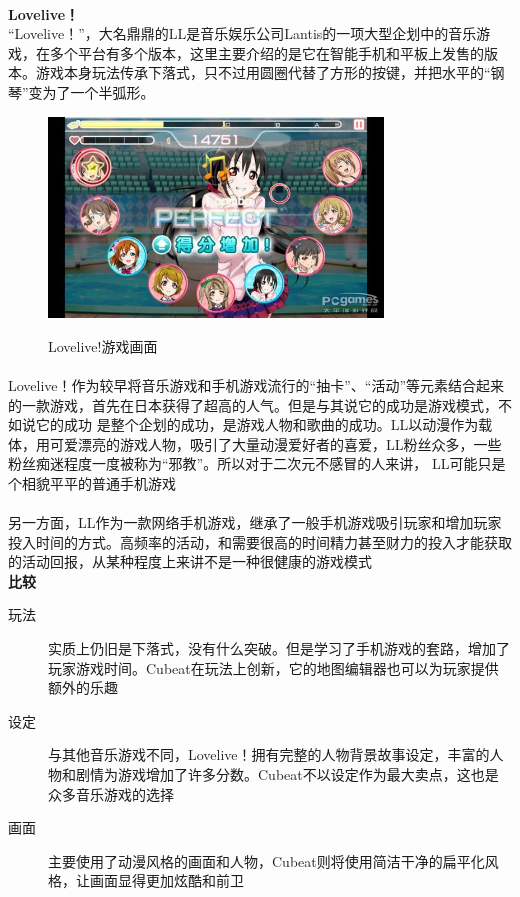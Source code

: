 \documentclass{article}
\begin{document}
\paragraph{}
\textbf{Lovelive！}\\
“Lovelive！”，大名鼎鼎的LL是音乐娱乐公司Lantis的一项大型企划中的音乐游戏，在多个平台有多个版本，这里主要介绍的是它在智能手机和平板上发售的版本。游戏本身玩法传承下落式，只不过用圆圈代替了方形的按键，并把水平的“钢琴”变为了一个半弧形。
\begin{figure}[H]
  \centering
  \includegraphics[width=24em]{ll.png}\\
  \caption{Lovelive!游戏画面}\label{3-4}
\end{figure}
\paragraph{}
Lovelive！作为较早将音乐游戏和手机游戏流行的“抽卡”、“活动”等元素结合起来的一款游戏，首先在日本获得了超高的人气。但是与其说它的成功是游戏模式，不如说它的成功
是整个企划的成功，是游戏人物和歌曲的成功。LL以动漫作为载体，用可爱漂亮的游戏人物，吸引了大量动漫爱好者的喜爱，LL粉丝众多，一些粉丝痴迷程度一度被称为“邪教”。所以对于二次元不感冒的人来讲，
LL可能只是个相貌平平的普通手机游戏
\paragraph{}
另一方面，LL作为一款网络手机游戏，继承了一般手机游戏吸引玩家和增加玩家投入时间的方式。高频率的活动，和需要很高的时间精力甚至财力的投入才能获取的活动回报，从某种程度上来讲不是一种很健康的游戏模式\\
\textbf{比较}
\begin{description}
  \item[玩法] 实质上仍旧是下落式，没有什么突破。但是学习了手机游戏的套路，增加了玩家游戏时间。Cubeat在玩法上创新，它的地图编辑器也可以为玩家提供额外的乐趣
  \item[设定] 与其他音乐游戏不同，Lovelive！拥有完整的人物背景故事设定，丰富的人物和剧情为游戏增加了许多分数。Cubeat不以设定作为最大卖点，这也是众多音乐游戏的选择
  \item[画面] 主要使用了动漫风格的画面和人物，Cubeat则将使用简洁干净的扁平化风格，让画面显得更加炫酷和前卫
\end{description}
\end{document}

